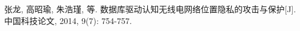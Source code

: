 
\begin{publications}{99}

    \item\textsc{张龙, 高昭瑜, 朱浩瑾, 等}. {数据库驱动认知无线电网络位置隐私的攻击与保护}[J]. 中国科技论文, 2014, 9(7): 754-757.
     
\end{publications}



